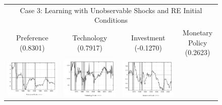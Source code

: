 \begin{figure}
\begin{tabular}{cccc}
\multicolumn{4}{c}{Case 3: Learning with Unobservable Shocks and RE Initial Conditions} \\ 
Preference (0.8301) & Technology (0.7917) & Investment (-0.1270) & Monetary Policy (0.2623) \\
\includegraphics[scale=0.22]{results_reinit/prefshock.png} & 
\includegraphics[scale=0.22]{results_reinit/techshock.png} & 
\includegraphics[scale=0.22]{results_reinit/invshock.png} & 

\end{tabular}
\end{figure}
